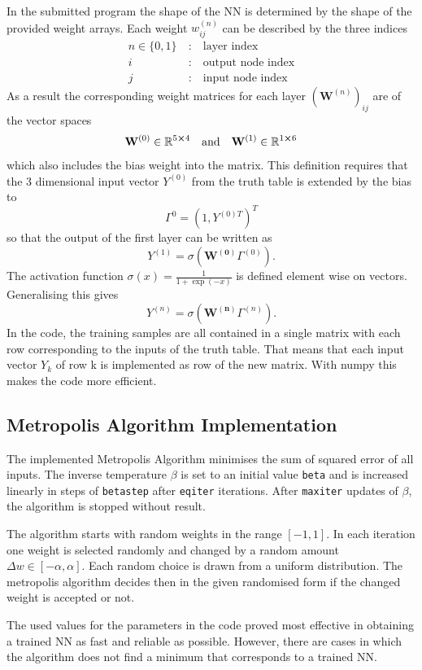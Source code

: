 \documentclass[11pt,a4paper]{article}
\begin{document}
In the submitted program the shape of the NN is determined by the shape of
the provided weight arrays. Each weight $w_{ij}^{(n)}$ can be described by the 
three indices
\begin{align*}
    n \in \{0,1\} \ &: \quad \text{layer index} \\
    i \ &: \quad \text{output node index} \\
    j \ &: \quad \text{input node index}
\end{align*}
As a result the corresponding weight matrices for each layer $(\mathbf{W}^{(n)})_{ij}$ 
are of the vector spaces
\begin{align}
    \mathbf{W}^{(0)}\in \mathbb{R}^{5\cross 4} \quad \text{and} \quad 
    \mathbf{W}^{(1)}\in \mathbb{R}^{1\cross 6}
\end{align}
which also includes the bias weight into the matrix. This definition requires that
the 3 dimensional input vector $Y^{(0)}$ from the truth table is extended by the bias
to
\begin{equation*}
    \Gamma^{0} = \left( 1,  Y^{(0) T} \right)^T
\end{equation*}
so that the output of the first layer can be written as
\begin{equation}
    Y^{(1)} = \sigma(\mathbf{W^{(0)}} \Gamma^{(0)} ) .
\end{equation}
The activation function $\sigma(x) = \frac{1}{1+\exp(-x)}$ is defined element wise on 
vectors. Generalising this gives
\begin{equation}
    Y^{(n)} = \sigma(\mathbf{W^{(n)}} \Gamma^{(n)} ) .
\end{equation}
In the code, the training samples are all contained in a single matrix with
each row corresponding to the inputs of the truth table. That means that 
each input vector $Y_k$ of row k is implemented as row of the new matrix. With numpy
this makes the code more efficient.

\subsection*{Metropolis Algorithm Implementation}
The implemented Metropolis Algorithm minimises the sum of squared error of all inputs.
The inverse temperature $\beta$ is set to an initial value \texttt{beta} and is 
increased linearly in steps of \texttt{betastep} after \texttt{eqiter} iterations.
After \texttt{maxiter} updates of $\beta$, the algorithm is stopped without result.

The algorithm starts with random weights in the range $\left[-1, 1\right]$.
In each iteration one weight is selected randomly and changed by a random amount
$\Delta w \in \left[-\alpha, \alpha\right]$. Each random choice is drawn from a uniform 
distribution. The metropolis algorithm decides then in the given randomised form
if the changed weight is accepted or not.

The used values for the parameters in the code proved most effective in obtaining
a trained NN as fast and reliable as possible. However, there are cases in which the
algorithm does not find a minimum that corresponds to a trained NN.
\end{document}
